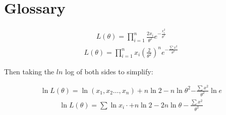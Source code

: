 \documentclass{article}
\begin{document}
\newpage
\section{Glossary}\label{glossary}




\begin{align}
    L(\theta) = \prod_{i=1}^n\frac{2x_{i}}{\theta^2}e^{-\frac{x_{i}^2}{\theta^2}}
\end{align}
\begin{align}
    L(\theta) = \prod_{i=1}^n x_{i}(\frac{2}{\theta^2})^n e^{-\frac{\sum{x^2}}{\theta^2}}
\end{align}

Then taking the $ln$ log of both sides to simplify:

\begin{align}
    \ln{L(\theta)}= \ln{(x_{1},x_{2}\dots,x_{n})} + n\ln{2} - n\ln\theta^2 {-\frac{\sum{x^2}}{\theta^2}}\ln{e}
\end{align}
\begin{align}
    \ln{L(\theta)}= \sum\ln{x_{i}} \cdot + n\ln{2} - 2n\ln{\theta} -\frac{\sum{x^2}}{\theta^2}
\end{align}
\end{document}
